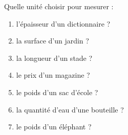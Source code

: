 \begin{exercice*}
   Quelle unité choisir pour mesurer :
   \begin{enumerate}
      \item l'épaisseur d'un dictionnaire ?
      \item la surface d'un jardin ?
      \item la longueur d'un stade ?
      \item le prix d'un magazine ? 
      \item le poids d'un sac d'école ?
      \item la quantité d'eau d'une bouteille ?
      \item le poids d'un éléphant ? 
   \end{enumerate}
\end{exercice*}
 